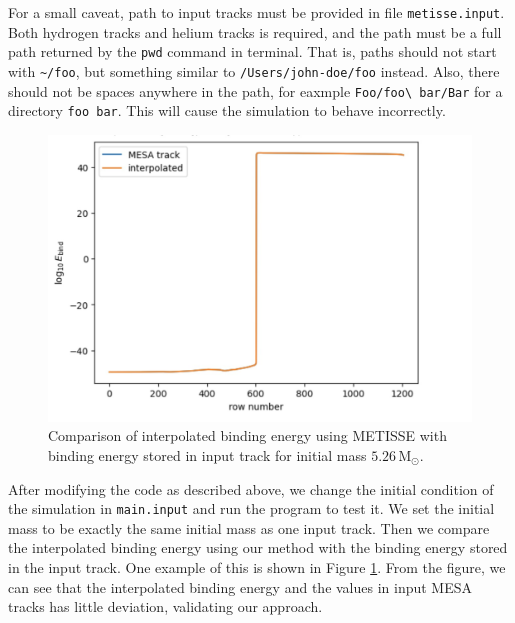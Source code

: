 \documentclass[12pt]{article}
\newcommand{\Msun}{\,\mathrm{M_{\odot}}}
\begin{document}
For a small caveat, path to input tracks must be provided in file \verb|metisse.input|. Both hydrogen tracks and helium tracks is required, and the path must be a full path returned by the \verb|pwd| command in terminal. That is, paths should not start with \verb|~/foo|, but something similar to \verb|/Users/john-doe/foo| instead. Also, there should not be spaces anywhere in the path, for eaxmple \verb*|Foo/foo\ bar/Bar| for a directory \verb*|foo bar|. This will cause the simulation to behave incorrectly. 

\begin{figure}
  \centering
  \includegraphics[width = 0.6\linewidth]{fig/be-comparison.png}
  \caption{Comparison of interpolated binding energy using METISSE with binding energy stored in input track for initial mass $5.26 \Msun$.}
  \label{be-comparison}
\end{figure}

After modifying the code as described above, we change the initial condition of the simulation in \verb|main.input| and run the program to test it. We set the initial mass to be exactly the same initial mass as one input track. Then we compare the interpolated binding energy using our method with the binding energy stored in the input track. One example of this is shown in Figure \ref{be-comparison}. From the figure, we can see that the interpolated binding energy and the values in input MESA tracks has little deviation, validating our approach.

\newpage


\end{document}
